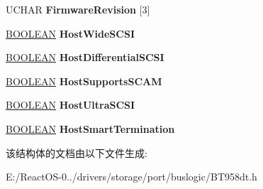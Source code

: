 \begin{DoxyCompactItemize}
\item 
\mbox{\label{struct___b_t958_extended_setup_info_a740a3f12771a4f6caf5fb3eca21d5adf}} 
U\+C\+H\+AR {\bfseries Firmware\+Revision} \mbox{[}3\mbox{]}
\item 
\mbox{\label{struct___b_t958_extended_setup_info_a2586d37328bb0fdf2ab34bfa72b82e07}} 
\hyperlink{_processor_bind_8h_a112e3146cb38b6ee95e64d85842e380a}{B\+O\+O\+L\+E\+AN} {\bfseries Host\+Wide\+S\+C\+SI}
\item 
\mbox{\label{struct___b_t958_extended_setup_info_a22d6591d1c10d5ae26939f4d68a39895}} 
\hyperlink{_processor_bind_8h_a112e3146cb38b6ee95e64d85842e380a}{B\+O\+O\+L\+E\+AN} {\bfseries Host\+Differential\+S\+C\+SI}
\item 
\mbox{\label{struct___b_t958_extended_setup_info_acf895b45e78a825a0d5e820342fe7ed6}} 
\hyperlink{_processor_bind_8h_a112e3146cb38b6ee95e64d85842e380a}{B\+O\+O\+L\+E\+AN} {\bfseries Host\+Supports\+S\+C\+AM}
\item 
\mbox{\label{struct___b_t958_extended_setup_info_aaf2dd0cbefc35da50ec2b04a0ad78fb7}} 
\hyperlink{_processor_bind_8h_a112e3146cb38b6ee95e64d85842e380a}{B\+O\+O\+L\+E\+AN} {\bfseries Host\+Ultra\+S\+C\+SI}
\item 
\mbox{\label{struct___b_t958_extended_setup_info_ab5d6286cd8d5cdc3ec7018c6f3a53f0f}} 
\hyperlink{_processor_bind_8h_a112e3146cb38b6ee95e64d85842e380a}{B\+O\+O\+L\+E\+AN} {\bfseries Host\+Smart\+Termination}
\end{DoxyCompactItemize}


该结构体的文档由以下文件生成\+:\begin{DoxyCompactItemize}
\item 
E\+:/\+React\+O\+S-\/0../drivers/storage/port/buslogic/B\+T958dt.\+h\end{DoxyCompactItemize}
